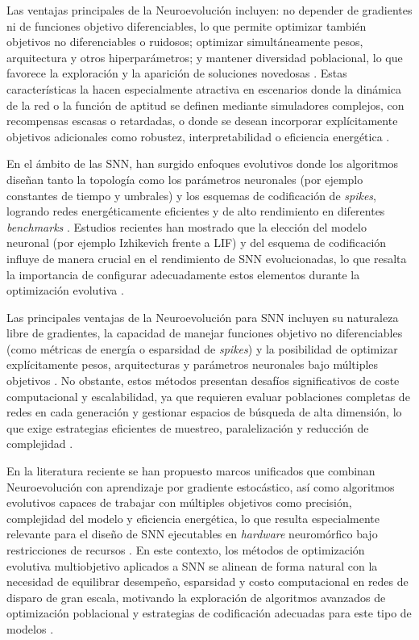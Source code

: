 Las ventajas principales de la Neuroevolución incluyen: no depender de gradientes ni de funciones objetivo diferenciables, lo que permite optimizar también objetivos no diferenciables o ruidosos; optimizar simultáneamente pesos, arquitectura y otros hiperparámetros; y mantener diversidad poblacional, lo que favorece la exploración y la aparición de soluciones novedosas \cite{Hiraga2024mutationbasedevolution}. Estas características la hacen especialmente atractiva en escenarios donde la dinámica de la red o la función de aptitud se definen mediante simuladores complejos, con recompensas escasas o retardadas, o donde se desean incorporar explícitamente objetivos adicionales como robustez, interpretabilidad o eficiencia energética \cite{risi2025neuroevolution}.

En el ámbito de las SNN, han surgido enfoques evolutivos donde los algoritmos diseñan tanto la topología como los parámetros neuronales (por ejemplo constantes de tiempo y umbrales) y los esquemas de codificación de \textit{spikes}, logrando redes energéticamente eficientes y de alto rendimiento en diferentes \textit{benchmarks} \cite{Shen2024EvolutionarySNN}. Estudios recientes han mostrado que la elección del modelo neuronal (por ejemplo Izhikevich frente a LIF) y del esquema de codificación influye de manera crucial en el rendimiento de SNN evolucionadas, lo que resalta la importancia de configurar adecuadamente estos elementos durante la optimización evolutiva \cite{LoyolaJara2026evolvingsnn}.

Las principales ventajas de la Neuroevolución para SNN incluyen su naturaleza libre de gradientes, la capacidad de manejar funciones objetivo no diferenciables (como métricas de energía o esparsidad de \textit{spikes}) y la posibilidad de optimizar explícitamente pesos, arquitecturas y parámetros neuronales bajo múltiples objetivos \cite{Shen2024EvolutionarySNN, Schuman2022Opportunities}. No obstante, estos métodos presentan desafíos significativos de coste computacional y escalabilidad, ya que requieren evaluar poblaciones completas de redes en cada generación y gestionar espacios de búsqueda de alta dimensión, lo que exige estrategias eficientes de muestreo, paralelización y reducción de complejidad \cite{Hiraga2024mutationbasedevolution, Such2017deepneuroevolution}.

En la literatura reciente se han propuesto marcos unificados que combinan Neuroevolución con aprendizaje por gradiente estocástico, así como algoritmos evolutivos capaces de trabajar con múltiples objetivos como precisión, complejidad del modelo y eficiencia energética, lo que resulta especialmente relevante para el diseño de SNN ejecutables en \textit{hardware} neuromórfico bajo restricciones de recursos \cite{Zhang2023DNN_Neuroevolution_SGD, Shen2024EvolutionarySNN}. En este contexto, los métodos de optimización evolutiva multiobjetivo aplicados a SNN se alinean de forma natural con la necesidad de equilibrar desempeño, esparsidad y costo computacional en redes de disparo de gran escala, motivando la exploración de algoritmos avanzados de optimización poblacional y estrategias de codificación adecuadas para este tipo de modelos \cite{Shen2024EvolutionarySNN, Hiraga2024mutationbasedevolution}.


